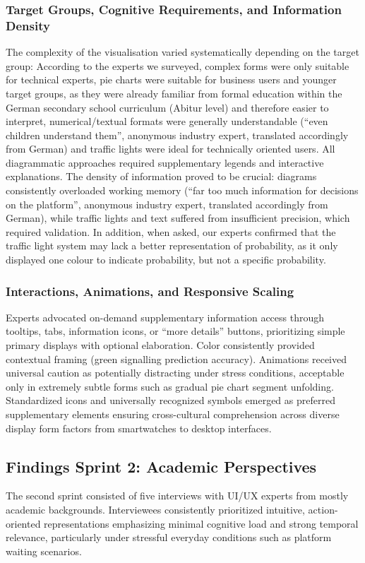\documentclass[final,journal,a4paper]{IEEEtran}
\begin{document}
\subsubsection{Target Groups, Cognitive Requirements, and Information Density}
The complexity of the visualisation varied systematically depending on the target group: According to the experts we surveyed, complex forms were only suitable for technical experts, pie charts were suitable for business users and younger target groups, as they were already familiar from formal education within the German secondary school curriculum (Abitur level) and therefore easier to interpret, numerical/textual formats were generally understandable (``even children understand them'', anonymous industry expert, translated accordingly from German) and traffic lights were ideal for technically oriented users. All diagrammatic approaches required supplementary legends and interactive explanations. The density of information proved to be crucial: diagrams consistently overloaded working memory (``far too much information for decisions on the platform'', anonymous industry expert, translated accordingly from German), while traffic lights and text suffered from insufficient precision, which required validation. In addition, when asked, our experts confirmed that the traffic light system may lack a better representation of probability, as it only displayed one colour to indicate probability, but not a specific probability.

\subsubsection{Interactions, Animations, and Responsive Scaling}
Experts advocated on-demand supplementary information access through tooltips, tabs, information icons, or ``more details'' buttons, prioritizing simple primary displays with optional elaboration. Color consistently provided contextual framing (green signalling prediction accuracy). Animations received universal caution as potentially distracting under stress conditions, acceptable only in extremely subtle forms such as gradual pie chart segment unfolding. Standardized icons and universally recognized symbols emerged as preferred supplementary elements ensuring cross-cultural comprehension across diverse display form factors from smartwatches to desktop interfaces.

\subsection{Findings Sprint 2: Academic Perspectives}
The second sprint consisted of five interviews with UI/UX experts from mostly academic backgrounds. Interviewees consistently prioritized intuitive, action-oriented representations emphasizing minimal cognitive load and strong temporal relevance, particularly under stressful everyday conditions such as platform waiting scenarios.
\end{document}
